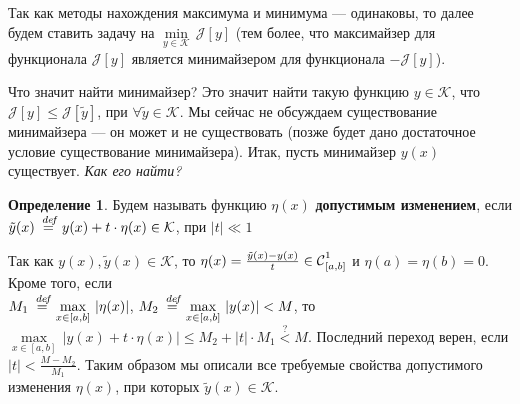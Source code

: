 \documentclass[12pt,a4paper,openany,fleqn]{book}
\newcommand {\defeq}{\stackrel{\hspace{0.09 cm}de\!f}{=}}
\newcommand {\eqdef}{\defeq}
\newcommand{\Cf}{\ensuremath{\mathcal{C}}}
\newcommand{\J}{\ensuremath{\mathcal{J}}}
\newcommand{\mc}[1]{\ensuremath{\mathcal{#1}}}
\newcommand{\Cfn}[2][]{\ensuremath{\Cf{\mathstrut}^{#2}_{#1}}}
\theoremstyle{definition}
\newtheorem{_def}{Определение}[section]
\begin{document}
Так как методы нахождения максимума и минимума --- одинаковы, то далее будем ставить задачу на $\min\limits_{y\in\mc{K}}\,\J[y]$ (тем более, что максимайзер для функционала $\J[y]$ является минимайзером для функционала $-\J[y]$). 

Что значит найти минимайзер? Это значит найти такую функцию $y\in\mc{K}$, что $\J[y]\leqslant\J[\tilde{y}]$, при $\forall\tilde{y}\in\mc{K}$. Мы сейчас не обсуждаем существование минимайзера --- он может и не существовать (позже будет дано достаточное условие существование минимайзера). Итак, пусть минимайзер $y(x)$ существует. \emph{Как его найти?}
\begin{_def}
	Будем называть функцию $\eta(x)$ \textbf{допустимым изменением}, если \\
	$\tilde{y}(x)\eqdef y(x)+t\cdot\eta(x)\in\mc{K}$, при $|t|\ll1$
\end{_def}
Так как $y(x),\tilde{y}(x)\in\mc{K}$, то $\eta(x)=\frac{\tilde{y}(x)-y(x)}t\in\Cfn[{[a,b]}]{1}$ и $\eta(a)=\eta(b)=0$. Кроме того, если\\ $M_1\eqdef\max\limits_{x\in{[a,b]}}\,|\eta(x)|$, $M_2\eqdef\max\limits_{x\in{[a,b]}}\,|y(x)|<M$, то 
$\max\limits_{x\in{[a,b]}}\,|y(x)+t\cdot\eta(x)|\leqslant M_2+|t|\cdot M_1\stackrel{?}{<}M$. Последний переход верен, если $|t|<\frac{M-M_2}{M_1}$. Таким образом мы описали все требуемые свойства допустимого изменения $\eta(x)$, при которых $\tilde{y}(x)\in\mc{K}$.
\end{document}
